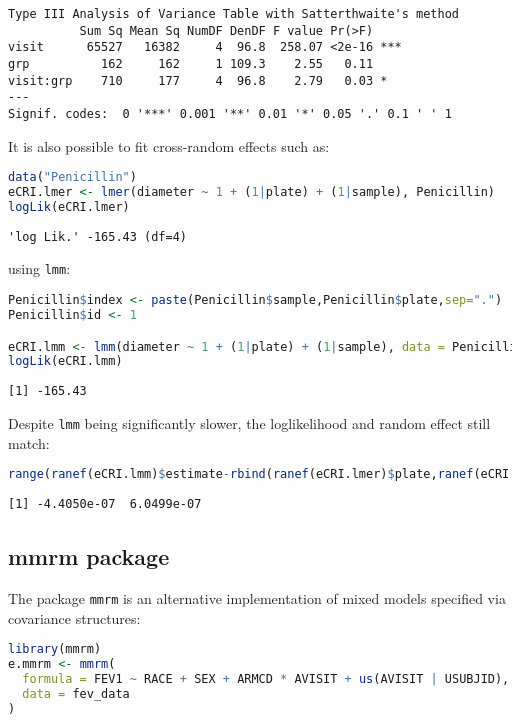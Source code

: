 \documentclass[12pt]{article}
\begin{document}
\label{}
\begin{verbatim}
Type III Analysis of Variance Table with Satterthwaite's method
          Sum Sq Mean Sq NumDF DenDF F value Pr(>F)    
visit      65527   16382     4  96.8  258.07 <2e-16 ***
grp          162     162     1 109.3    2.55   0.11    
visit:grp    710     177     4  96.8    2.79   0.03 *  
---
Signif. codes:  0 '***' 0.001 '**' 0.01 '*' 0.05 '.' 0.1 ' ' 1
\end{verbatim}


It is also possible to fit cross-random effects such as:
\begin{lstlisting}[language=r,numbers=none]
data("Penicillin")
eCRI.lmer <- lmer(diameter ~ 1 + (1|plate) + (1|sample), Penicillin)
logLik(eCRI.lmer)
\end{lstlisting}

\label{}
\begin{verbatim}
'log Lik.' -165.43 (df=4)
\end{verbatim}



using \texttt{lmm}:
\begin{lstlisting}[language=r,numbers=none]
Penicillin$index <- paste(Penicillin$sample,Penicillin$plate,sep=".")
Penicillin$id <- 1

eCRI.lmm <- lmm(diameter ~ 1 + (1|plate) + (1|sample), data = Penicillin)
logLik(eCRI.lmm)
\end{lstlisting}

\label{}
\begin{verbatim}
[1] -165.43
\end{verbatim}


Despite \texttt{lmm} being significantly slower, the loglikelihood and random
effect still match:
\begin{lstlisting}[language=r,numbers=none]
range(ranef(eCRI.lmm)$estimate-rbind(ranef(eCRI.lmer)$plate,ranef(eCRI.lmer)$sample))
\end{lstlisting}

\label{}
\begin{verbatim}
[1] -4.4050e-07  6.0499e-07
\end{verbatim}


\clearpage
\subsection{mmrm package}
\label{sec:orged18e50}

The package \texttt{mmrm} is an alternative implementation of mixed models
specified via covariance structures:
\begin{lstlisting}[language=r,numbers=none]
library(mmrm)
e.mmrm <- mmrm(
  formula = FEV1 ~ RACE + SEX + ARMCD * AVISIT + us(AVISIT | USUBJID),
  data = fev_data
)
\end{lstlisting}
\end{document}
